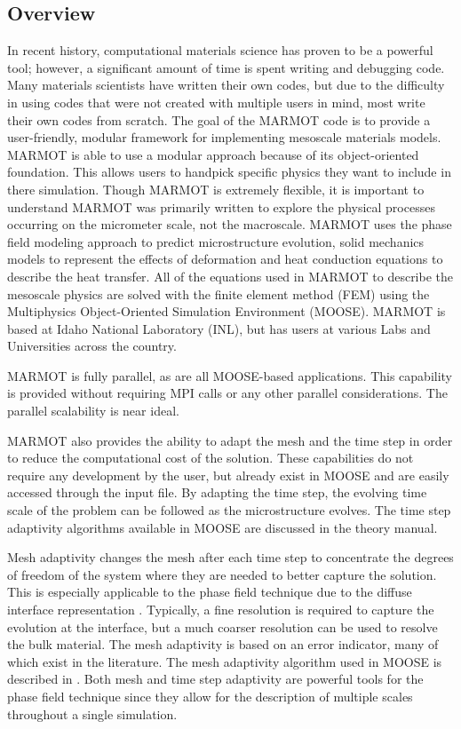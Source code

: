 \documentclass[letter,12pt,fleqn]{article}
\begin{document}
\subsection{Overview}

In recent history, computational materials science has proven to be a powerful tool; however, a significant amount of time is spent writing and debugging code. Many materials scientists have written their own codes, but due to the difficulty in using codes that were not created with multiple users in mind, most write their own codes from scratch. The goal of the MARMOT code is to provide a user-friendly, modular framework for implementing mesoscale materials models. MARMOT is able to use a modular approach because of its object-oriented foundation. This allows users to handpick specific physics they want to include in there simulation. Though MARMOT is extremely flexible, it is important to understand MARMOT was primarily written to explore the physical processes occurring on the micrometer scale, not the macroscale. MARMOT uses the phase field modeling approach to predict microstructure evolution, solid mechanics models to represent the effects of deformation and heat conduction equations to describe the heat transfer. All of the equations used in MARMOT to describe the mesoscale physics are solved with the finite element method (FEM) using the Multiphysics Object-Oriented Simulation Environment (MOOSE). MARMOT is based at Idaho National Laboratory (INL), but has users at various Labs and Universities across the country.

MARMOT is fully parallel, as are all MOOSE-based applications.  This capability is provided without requiring MPI calls or any other parallel considerations.  The parallel scalability is near ideal.

MARMOT also provides the ability to adapt the mesh and the time step in order to reduce the computational cost of the solution.  These capabilities do not require any development by the user, but already exist in MOOSE and are easily accessed through the input file.  By adapting the time step, the evolving time scale of the problem can be followed as the microstructure evolves.  The time step adaptivity algorithms available in MOOSE are discussed in the theory manual.

Mesh adaptivity changes the mesh after each time step to concentrate the degrees of freedom of the system where they are needed to better capture the solution.  This is especially applicable to the phase field technique due to the diffuse interface representation \citep{provatas1999,takaki2005,feng2006}.  Typically, a fine resolution is required to capture the evolution at the interface, but a much coarser resolution can be used to resolve the bulk material.   The mesh adaptivity is based on an error indicator, many of which exist in the literature.  The mesh adaptivity algorithm used in MOOSE is described in \citet{stogner2008}.  Both mesh and time step adaptivity are powerful tools for the phase field technique since they allow for the description of multiple scales throughout a single simulation.     
\end{document}
